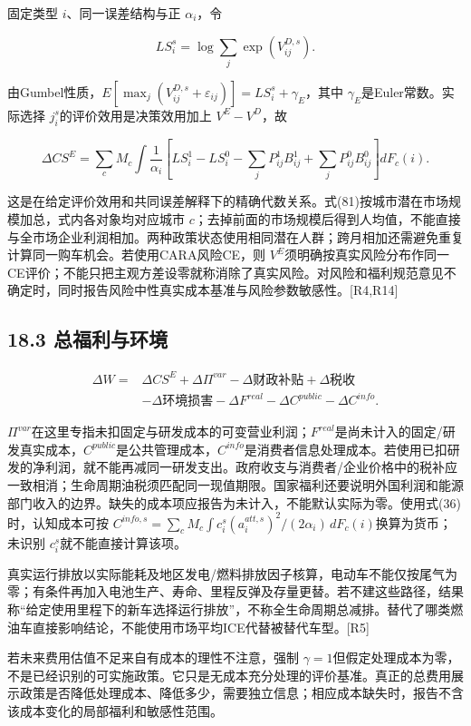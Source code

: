 \documentclass[
  11pt,
]{article}
\begin{document}
固定类型 \(i\)、同一误差结构与正 \(\alpha_i\)，令

\[
LS_i^s=\log\sum_j\exp(V_{ij}^{D,s}).
\tag{80}
\]

由Gumbel性质，\(E[\max_j(V_{ij}^{D,s}+\varepsilon_{ij})]=LS_i^s+\gamma_E\)，其中
\(\gamma_E\)是Euler常数。实际选择 \(j_i^s\)的评价效用是决策效用加上
\(V^E-V^D\)，故

\[
\boxed{
\Delta CS^E
=\sum_c M_c\int\frac1{\alpha_i}
\left[LS_i^1-LS_i^0
-\sum_jP_{ij}^1B_{ij}^1
+\sum_jP_{ij}^0B_{ij}^0\right]dF_c(i).
}
\tag{81}
\]

这是在给定评价效用和共同误差解释下的精确代数关系。式(81)按城市潜在市场规模加总，式内各对象均对应城市
\(c\)；去掉前面的市场规模后得到人均值，不能直接与全市场企业利润相加。两种政策状态使用相同潜在人群；跨月相加还需避免重复计算同一购车机会。若使用CARA风险CE，则
\(V^E\)须明确按真实风险分布作同一CE评价；不能只把主观方差设零就称消除了真实风险。对风险和福利规范意见不确定时，同时报告风险中性真实成本基准与风险参数敏感性。{[}R4,R14{]}

\subsection{18.3
总福利与环境}\label{ux603bux798fux5229ux4e0eux73afux5883}

\[
\begin{aligned}
\Delta W={}&\Delta CS^E+\Delta\Pi^{var}
-\Delta\text{财政补贴}+\Delta\text{税收}\\
&-\Delta\text{环境损害}-\Delta F^{real}
-\Delta C^{public}-\Delta C^{info}.
\end{aligned}
\tag{82}
\]

\(\Pi^{var}\)在这里专指未扣固定与研发成本的可变营业利润；\(F^{real}\)是尚未计入的固定/研发真实成本，\(C^{public}\)是公共管理成本，\(C^{info}\)是消费者信息处理成本。若使用已扣研发的净利润，就不能再减同一研发支出。政府收支与消费者/企业价格中的税补应一致相消；生命周期油税须匹配同一现值期限。国家福利还要说明外国利润和能源部门收入的边界。缺失的成本项应报告为未计入，不能默认实际为零。使用式(36)时，认知成本可按
\(C^{info,s}=\sum_cM_c\int c_i^s(a_i^{att,s})^2/(2\alpha_i)\,dF_c(i)\)换算为货币；未识别
\(c_i^s\)就不能直接计算该项。

真实运行排放以实际能耗及地区发电/燃料排放因子核算，电动车不能仅按尾气为零；有条件再加入电池生产、寿命、里程反弹及存量更替。若不建这些路径，结果称``给定使用里程下的新车选择运行排放''，不称全生命周期总减排。替代了哪类燃油车直接影响结论，不能使用市场平均ICE代替被替代车型。{[}R5{]}

若未来费用估值不足来自有成本的理性不注意，强制
\(\gamma=1\)但假定处理成本为零，不是已经识别的可实施政策。它只是无成本充分处理的评价基准。真正的总费用展示政策是否降低处理成本、降低多少，需要独立信息；相应成本缺失时，报告不含该成本变化的局部福利和敏感性范围。
\end{document}
